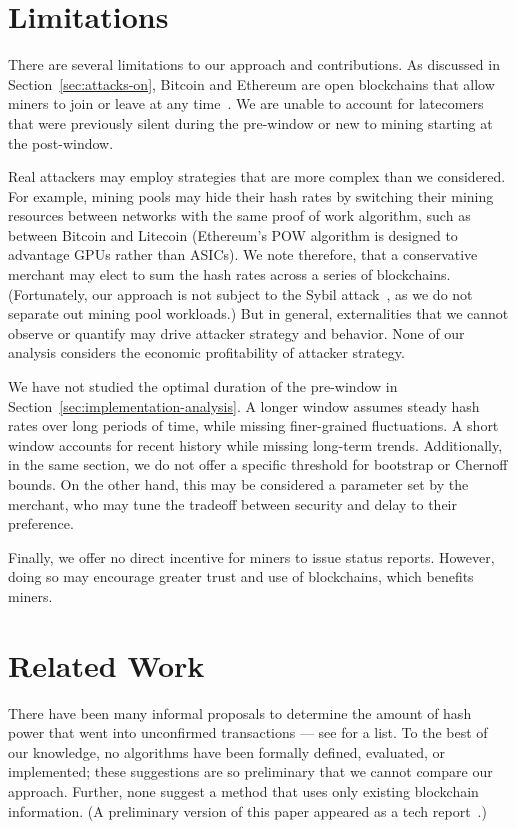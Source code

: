 \documentclass[10pt,sigconf]{acmart}
\newcommand{\1}{{\em (i)}}
\newcommand{\2}{{\em (ii)}}
\newcommand{\3}{{\em (iii)}}
\newcommand{\4}{{\em (iv)}}
\newcommand{\5}{{\em (v)}}
\begin{document}
\section{Limitations}
\label{sec:limitations}
There are several limitations to our approach and contributions. 
As discussed in Section~\ref{sec:attacks-on}, Bitcoin and Ethereum are open blockchains that allow miners to join or leave at any time~\cite{Vukolic:2015}. We are unable to account for latecomers that were previously silent during the pre-window or new to mining starting at the post-window. 

Real attackers may employ strategies that are more complex than we considered. For example, mining pools may hide their hash rates by switching their mining resources between networks with the same  proof of work algorithm, such as between Bitcoin and Litecoin (Ethereum's POW algorithm is designed to advantage GPUs rather than ASICs). We note therefore, that a conservative merchant may elect to sum the hash rates across a series of blockchains. (Fortunately, our approach is not subject to the Sybil attack~\cite{Douceur:2002}, as we do not separate out mining pool workloads.) But in general, externalities that we cannot observe or quantify may drive attacker strategy and  behavior.  None of our analysis considers the economic profitability of attacker strategy. 

We have not studied the optimal duration of the pre-window in Section~\ref{sec:implementation-analysis}. A longer window assumes steady hash rates over long periods of time, while missing finer-grained fluctuations. A short window accounts for recent history while missing long-term trends. 
Additionally, in the same section, we do not offer a specific threshold for 
bootstrap or Chernoff bounds. On the other hand, this may be considered a parameter set by the merchant, who may tune the tradeoff between security and delay to their preference.

Finally, we offer no direct incentive for miners to issue status reports. However, doing so may encourage greater trust and use of  blockchains, which benefits  miners.
\section{Related Work}

There have been many informal proposals to 
determine the amount of 
hash power that went into unconfirmed transactions --- see \cite{Bishop:2015} for a list. To the best of our  knowledge, no algorithms have been formally defined, evaluated, or implemented; these suggestions are so preliminary that we cannot compare our approach. Further, none suggest a method that uses only existing blockchain information. (A preliminary version of this paper appeared as a tech report~\cite{Ozisik:2016}.)
\end{document}
